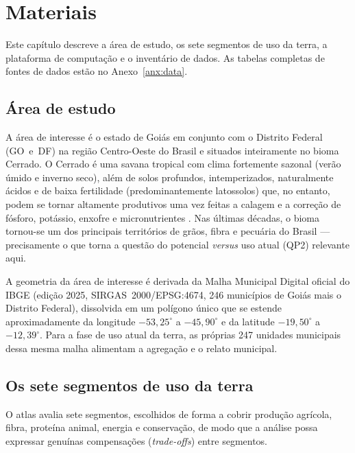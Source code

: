\chapter{Materiais}\label{ch:materials}

Este capítulo descreve a área de estudo, os sete segmentos de uso da terra, a plataforma de computação
e o inventário de dados. As tabelas completas de fontes de dados estão no Anexo~\ref{anx:data}.

\section{Área de estudo}

A área de interesse é o estado de Goiás em conjunto com o Distrito Federal (GO~e~DF)
na região Centro-Oeste do Brasil e situados inteiramente no bioma Cerrado. 
O Cerrado é uma savana tropical com clima fortemente sazonal
(verão úmido e inverno seco), além de solos profundos, intemperizados, naturalmente ácidos e
de baixa fertilidade (predominantemente latossolos) que, no
entanto, podem se tornar altamente produtivos uma vez feitas a calagem e a correção de fósforo,
potássio, enxofre e micronutrientes \citep[p.~617]{yamada_cerrado_2005}. Nas últimas décadas, o bioma tornou-se um dos principais territórios de grãos,
fibra e pecuária do Brasil --- precisamente o que torna a questão do potencial \emph{versus} uso
atual (QP2) relevante aqui.

A geometria da área de interesse é derivada da Malha Municipal Digital oficial do IBGE (edição 2025,
SIRGAS~2000/EPSG:4674, 246 municípios de Goiás mais o Distrito Federal), dissolvida em um polígono único
que se estende aproximadamente da longitude $-53{,}25^\circ$ a $-45{,}90^\circ$ e da latitude
$-19{,}50^\circ$ a $-12{,}39^\circ$. Para a fase de uso atual da terra, as próprias 247
unidades municipais dessa mesma malha alimentam a agregação e o relato municipal.

\section{Os sete segmentos de uso da terra}

O atlas avalia sete segmentos, escolhidos de forma a cobrir produção agrícola, fibra, proteína animal, energia e
conservação, de modo que a análise possa expressar genuínas compensações (\emph{trade-offs}) entre segmentos.

